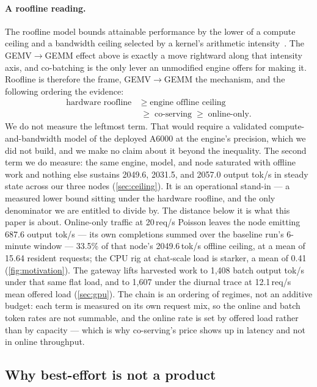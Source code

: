 \documentclass[conference]{IEEEtran}
\begin{document}
\paragraph{A roofline reading.} The roofline model bounds attainable performance by the
lower of a compute ceiling and a bandwidth ceiling selected by a kernel's arithmetic
intensity~\citep{roofline}. The GEMV$\to$GEMM effect above is exactly a move rightward
along that intensity axis, and co-batching is the only lever an unmodified engine offers
for making it. Roofline is therefore the frame, GEMV$\to$GEMM the mechanism, and the
following ordering the evidence:
\begin{equation*}
\begin{split}
  \text{hardware roofline} \;&\ge\; \text{engine offline ceiling} \\
  \;&\ge\; \text{co-serving} \;\ge\; \text{online-only}.
\end{split}
\end{equation*}
We do not measure the leftmost term. That would require a validated compute-and-bandwidth
model of the deployed A6000 at the engine's precision, which we did not build, and we make
no claim about it beyond the inequality. The second term we do measure: the same engine,
model, and node saturated with offline work and nothing else sustains 2049.6, 2031.5, and
2057.0 output tok/s in steady state across our three nodes (\cref{sec:ceiling}). It is an
operational stand-in --- a measured lower bound sitting under the hardware roofline, and
the only denominator we are entitled to divide by. The distance below it is what this
paper is about. Online-only traffic at 20\,req/s Poisson leaves the node emitting
687.6 output tok/s --- its own completions summed over the baseline run's 6-minute
window --- 33.5\% of that node's 2049.6\,tok/s offline ceiling, at a mean of 15.64
resident requests; the CPU rig at chat-scale load is starker, a mean of 0.41
(\cref{fig:motivation}). The gateway lifts harvested work to 1{,}408 batch output tok/s
under that same flat load, and to 1{,}607 under the diurnal trace at 12.1\,req/s mean
offered load (\cref{sec:gpu}). The chain is an ordering of regimes, not an additive
budget: each term is measured on its own request mix, so the online and batch token rates
are not summable, and the online rate is set by offered load rather than by capacity ---
which is why co-serving's price shows up in latency and not in online throughput.

\subsection{Why best-effort is not a product}
\label{sec:why-contract}
\end{document}
